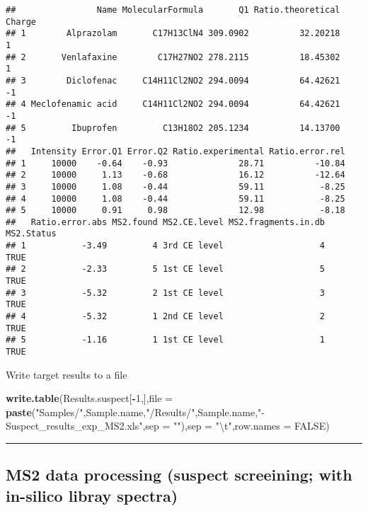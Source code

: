 \documentclass[]{article}
\newenvironment{Shaded}{\begin{snugshade}}{\end{snugshade}}
\newcommand{\KeywordTok}[1]{\textcolor[rgb]{0.13,0.29,0.53}{\textbf{#1}}}
\newcommand{\DataTypeTok}[1]{\textcolor[rgb]{0.13,0.29,0.53}{#1}}
\newcommand{\DecValTok}[1]{\textcolor[rgb]{0.00,0.00,0.81}{#1}}
\newcommand{\CharTok}[1]{\textcolor[rgb]{0.31,0.60,0.02}{#1}}
\newcommand{\StringTok}[1]{\textcolor[rgb]{0.31,0.60,0.02}{#1}}
\newcommand{\OtherTok}[1]{\textcolor[rgb]{0.56,0.35,0.01}{#1}}
\newcommand{\OperatorTok}[1]{\textcolor[rgb]{0.81,0.36,0.00}{\textbf{#1}}}
\newcommand{\NormalTok}[1]{#1}
\begin{document}
\begin{verbatim}
##                Name MolecularFormula       Q1 Ratio.theoretical Charge
## 1        Alprazolam       C17H13ClN4 309.0902          32.20218      1
## 2       Venlafaxine        C17H27NO2 278.2115          18.45302      1
## 3        Diclofenac     C14H11Cl2NO2 294.0094          64.42621     -1
## 4 Meclofenamic acid     C14H11Cl2NO2 294.0094          64.42621     -1
## 5         Ibuprofen         C13H18O2 205.1234          14.13700     -1
##   Intensity Error.Q1 Error.Q2 Ratio.experimental Ratio.error.rel
## 1     10000    -0.64    -0.93              28.71          -10.84
## 2     10000     1.13    -0.68              16.12          -12.64
## 3     10000     1.08    -0.44              59.11           -8.25
## 4     10000     1.08    -0.44              59.11           -8.25
## 5     10000     0.91     0.98              12.98           -8.18
##   Ratio.error.abs MS2.found MS2.CE.level MS2.fragments.in.db MS2.Status
## 1           -3.49         4 3rd CE level                   4       TRUE
## 2           -2.33         5 1st CE level                   5       TRUE
## 3           -5.32         2 1st CE level                   3       TRUE
## 4           -5.32         1 2nd CE level                   2       TRUE
## 5           -1.16         1 1st CE level                   1       TRUE
\end{verbatim}

Write target results to a file

\begin{Shaded}
\begin{Highlighting}[]
\KeywordTok{write.table}\NormalTok{(Results.suspect[}\OperatorTok{-}\DecValTok{1}\NormalTok{,],}\DataTypeTok{file =} \KeywordTok{paste}\NormalTok{(}\StringTok{"Samples/"}\NormalTok{,Sample.name,}\StringTok{"/Results/"}\NormalTok{,Sample.name,}\StringTok{"-Suspect_results_exp_MS2.xls"}\NormalTok{,}\DataTypeTok{sep =} \StringTok{""}\NormalTok{),}\DataTypeTok{sep =} \StringTok{"}\CharTok{\textbackslash{}t}\StringTok{"}\NormalTok{,}\DataTypeTok{row.names =} \OtherTok{FALSE}\NormalTok{)}
\end{Highlighting}
\end{Shaded}

\begin{center}\rule{0.5\linewidth}{\linethickness}\end{center}

\subsection{MS2 data processing (suspect screeining; with in-silico
libray
spectra)}\label{ms2-data-processing-suspect-screeining-with-in-silico-libray-spectra}
\end{document}
